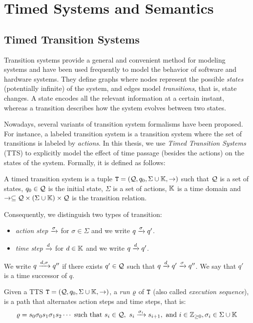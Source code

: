 \chapter{Timed Systems and Semantics}\label{chap:2} 
\minitoc
\section{Timed Transition Systems}
Transition systems provide a general and convenient method for modeling 
systems and have been used frequently to model the behavior of 
software and hardware systems. They define graphs where nodes
represent the possible \emph{states} (potentially infinite) of the system, and edges model 
\emph{transitions}, that is, state changes. A state encodes all the relevant 
information at a certain instant, whereas a transition describes how the system
evolves between two states. 

Nowadays, several variants of transition system formalisms have been 
proposed. For instance, a labeled transition system is a transition system
where the set of transitions is labeled by \emph{actions}.
In this thesis, we use \emph{Timed Transition Systems} (TTS)
to explicitly model the effect of time passage (besides the actions)
on the states of the system. Formally, it is defined as follows:  

\begin{definition}\label{def:tts}
  A timed transition system is a tuple $\texttt{T}=(\mathcal{Q},q_0,\Sigma\cup\mathbb{K},\to)$ such that $\mathcal{Q}$ is 
  a set of states, $q_0\in\mathcal{Q}$ is the initial state, $\Sigma$ is a set of
  actions, $\mathbb{K}$ is a time domain and $\to\subseteq\mathcal{Q}\times
  (\Sigma\cup\mathbb{K})\times\mathcal{Q}$ is the transition relation.
\end{definition}
Consequently, we distinguish two types of transition:
\begin{itemize}
  \item \emph{action step} $\xrightarrow{\sigma}$ for $\sigma\in\Sigma$ and we write 
    $q\xrightarrow{\sigma}q'$. 
  \item \emph{time step} $\xrightarrow{d}$ for $d\in\mathbb{K}$ and we write $q\xrightarrow{d}q'$. 
\end{itemize}
We write $q\xrightarrow{d,\sigma}q''$ if there exists $q'\in\mathcal{Q}$
such that $q\xrightarrow{d}q'\xrightarrow{\sigma}q''$. We say that $q'$ is
a time successor of $q$.

Given a TTS $\texttt{T}=(\mathcal{Q},q_0,\Sigma\cup\mathbb{K},\to)$, a \emph{run} $\varrho$ of $\texttt{T}$ (also called 
\emph{execution sequence}), is a path that alternates action steps and 
time steps, that is:
\begin{displaymath}
  \varrho=s_0\sigma_0 s_1\sigma_1 s_2\cdots \text{ such that } 
  s_i\in\mathcal{Q}, \  s_i\xrightarrow{\sigma_{i}}s_{i+1},\text{ and } 
  i\in\mathbb{Z}_{\ge 0},\sigma_i\in\Sigma\cup\mathbb{K}
\end{displaymath}

